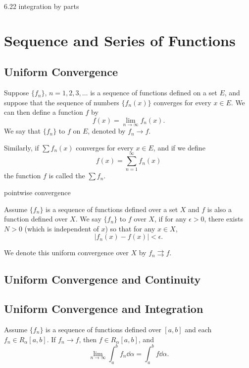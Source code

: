 6.22 integration by parts

\chapter{Sequence and Series of Functions}
\section{Uniform Convergence}
\begin{definition}
Suppose $\{f_n\}$, $n=1,2,3,\dots$ is a sequence of functions defined on a set $E$, and suppose that the sequence of numbers $\{f_n(x)\}$ converges for every $x\in E$. We can then define a function $f$ by
\[ f(x)=\lim_{n\to\infty}f_n(x). \]
We say that $\{f_n\}$  to $f$ on $E$, denoted by $f_n\to f$.

Similarly, if $\sum f_n(x)$ converges for every $x\in E$, and if we define
\[ f(x)=\sum_{n=1}^\infty f_n(x) \]
the function $f$ is called the  $\sum f_n$.
\end{definition}
pointwise convergence

\begin{definition}
Assume $\{f_n\}$ is a sequence of functions defined over a set $X$ and $f$ is also a function defined over $X$. We say $\{f_n\}$  to $f$ over $X$, if for any $\epsilon>0$, there exists $N>0$ (which is independent of $x$) so that for any $x\in X$,
\[ |f_n(x)-f(x)|<\epsilon. \]
\end{definition}

\begin{notation}
We denote this uniform convergence over $X$ by $f_n\rightrightarrows f$.
\end{notation}

\section{Uniform Convergence and Continuity}

\section{Uniform Convergence and Integration}
\begin{theorem}
Assume $\{f_n\}$ is a sequence of functions defined over $[a,b]$ and each $f_n\in R_\alpha[a,b]$. If $f_n\to f$, then $f\in R_\alpha[a,b]$, and
\[ \lim_{n\to\infty}\int_a^bf_n\dd{\alpha}=\int_a^bf\dd{\alpha}. \]
\end{theorem}

